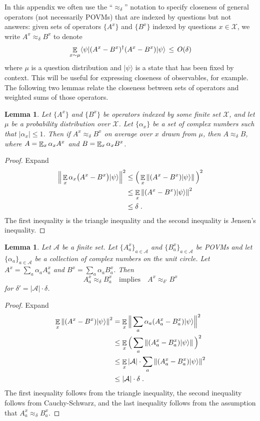 \documentclass[11pt]{article}
\newtheorem{lemma}[theorem]{Lemma}
\theoremstyle{definition}
\newcommand{\ket}[1]{|#1\rangle}
\newcommand{\bra}[1]{\langle#1|}
\newcommand{\norm}[1]{\left\| {#1} \right\|}
\newcommand{\E}{\mathop{\mathbb{E}}\displaylimits}
\renewcommand{\cal}[1]{\mathcal{#1}}
\begin{document}
In this appendix we often use the ``$\approx_\delta$'' notation to specify closeness of general operators (not necessarily POVMs) that are indexed by questions but not answers: given sets of operators $\{A^x \}$ and $\{B^x\}$ indexed by questions $x \in \cal{X}$, we write $A^x \approx_\delta B^x$ to denote \[
	\E_{x \sim \mu} \bra{\psi} (A^x - B^x)^\dagger (A^x - B^x)
        \ket{\psi}\,\leq\, O(\delta)
      \]
where $\mu$ is a question distribution and $\ket{\psi}$ is a state that has been fixed by context. This will be useful for expressing closeness of observables, for example. The following two lemmas relate the closeness between sets of operators and weighted sums of those operators. 
\begin{lemma}
\label{lem:avg-closeness}
Let $\{A^x \}$ and $\{B^x\}$ be operators indexed by some finite set $\mathcal{X}$, and let $\mu$ be a probability distribution over $\mathcal{X}$. Let $\{\alpha_x \}$ be a set of complex numbers such that $|\alpha_x| \leq 1$. Then if $A^x \approx_\delta B^x$ on average over $x$ drawn from $\mu$, then $A \approx_\delta B$, where $A = \E_x \alpha_x A^x$ and $B= \E_x \alpha_x B^x$.
\end{lemma}
\begin{proof}
Expand
\begin{align*}
	\Big\| \E_x \alpha_x \big ( A^x - B^x \big) \ket{\psi} \Big\|^2 &\leq \Big( \E_x \norm{ (A^x -B^x) \ket{\psi}} \Big)^2 \\
	&\leq \E_x \norm{(A^x - B^x) \ket{\psi}}^2 \\
	&\leq \delta\;.
\end{align*}
The first inequality is the triangle inequality and the second inequality is Jensen's inequality. 
\end{proof}

\begin{lemma}
\label{lem:povm-to-obs}
Let $\mathcal{A}$ be a finite set. Let $\{A^x_a \}_{a \in \mathcal{A}}$ and $\{B^x_a\}_{a \in \mathcal{A}}$ be POVMs and let $\{ \alpha_a \}_{a \in \mathcal{A}}$ be a collection of complex numbers on the unit circle. Let $A^x = \sum_a \alpha_a A^x_a$ and $B^x = \sum_a  \alpha_a B^x_a$. Then 
\[
	A^x_a \approx_\delta B^x_a \quad \text{implies} \quad A^x \approx_{\delta'} B^x
\]
for $\delta' = |\mathcal{A}| \cdot \delta$.
\end{lemma}
\begin{proof}
Expand
	\begin{align*}
		\E_x \norm{(A^x - B^x) \ket{\psi}}^2 &= \E_x \Big\|\sum_a \alpha_a (A^x_a - B^x_a) \ket{\psi}\Big\|^2 \\
		&\leq \E_x \Big( \sum_a \norm{ (A^x_a - B^x_a) \ket{\psi}} \Big)^2 \\
		&\leq \E_x |\mathcal{A}| \cdot \sum_a \norm{ (A^x_a - B^x_a) \ket{\psi}}^2 \\
		&\leq |\mathcal{A}| \cdot \delta\;.
	\end{align*}
The first inequality follows from the triangle inequality, the second inequality follows from Cauchy-Schwarz, and the last inequality follows from the assumption that $A^x_a \approx_\delta B^x_a$. 
\end{proof}
\end{document}
